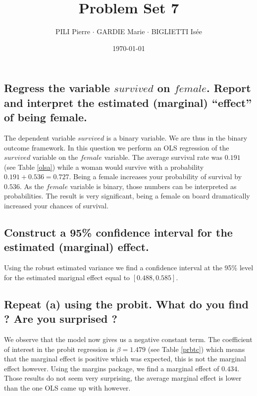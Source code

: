 \documentclass[12pt]{article}
\title{Problem Set 7}
\author{PILI Pierre $\cdot$ GARDIE Marie $\cdot$ BIGLIETTI Isée}
\date{\today}
\renewcommand{\thesubsection}{\arabic{section}.\arabic{subsection}}
\begin{document}
\maketitle
\renewcommand{\thesubsection}{\alph{subsection}}

\subsection{Regress the variable $survived$ on $female$. Report and interpret the estimated (marginal) “effect” of being female.}

The dependent variable $survived$ is a binary variable. We are thus in the binary outcome framework. In this question we perform an OLS regression of the $survived$
variable on the $female$ variable. The average survival rate was $0.191$ (see Table \ref{olsa}) while a woman would survive with a probability $0.191 + 0.536 = 0.727$.
Being a female increases your probability of survival by $0.536$. As the $female$ variable is binary, those numbers can be interpreted as probabilities. The result is very significant, being a female on board dramatically increased your chances of survival.

\subsection{Construct a 95\% confidence interval for the estimated (marginal) effect.}
Using the robust estimated variance we find a confidence interval at the 95\% level for the estimated marignal effect equal to $[0.488, 0.585]$.

\subsection{Repeat (a) using the probit. What do you find ? Are you surprised ?}

We observe that the model now gives us a negative constant term. The coefficient of interest in the probit regression is $\beta = 1.479$ (see Table \ref{prbtc}) which means that the marginal effect is positive which was expected, this is not the marginal effect however. Using the margins package, we find a marginal effect of $0.434$. Those results do not seem very surprising, the average marginal effect is lower than the one OLS came up with however. 

\end{document}
